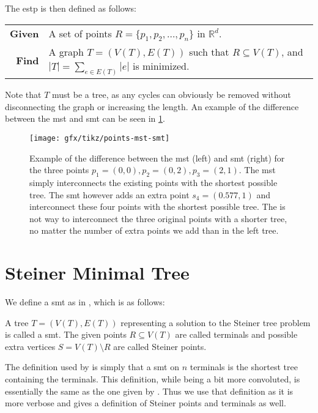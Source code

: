 The \ac{estp} is then defined as follows:
%
\begin{center}
  \begin{tabular}{rp{9cm}}
    \toprule
    \textbf{Given} & A set of points $R = \{ p_1, p_2, \ldots, p_n \}$ in
                     $\mathbb{R}^d$. \\
    \textbf{Find} & A graph $T = (V(T), E(T))$ such that $R \subseteq V(T)$, and
                    $|T| = \sum_{e \in E(T)} |e|$ is minimized. \\
    \bottomrule
  \end{tabular}
\end{center}
%
Note that $T$ must be a tree, as any cycles can obviously be removed without
disconnecting the graph or increasing the length. An example of the difference
between the \ac{mst} and \ac{smt} can be seen in \cref{fig:points-mst-smt}.
%
\begin{figure}[htbp]
  \centering
  \texttt{[image: gfx/tikz/points-mst-smt]}
  \caption[\ac{mst} vs. \ac{smt}]{Example of the difference between the \ac{mst} (left)
    and \ac{smt} (right) for the three points $p_1 = (0,0), p_2 = (0, 2), p_3 = (2,
    1)$. The \ac{mst} simply interconnects the existing points with the shortest
    possible tree. The \ac{smt} however adds an extra point $s_4 = (0.577, 1)$
    and interconnect these four points with the shortest possible tree. The is
    not way to interconnect the three original points with a shorter tree, no
    matter the number of extra points we add than in the left
    tree.\label{fig:points-mst-smt}}
\end{figure}

\section{Steiner Minimal Tree}
\label{sec:steiner-minimal-tree}

We define a \ac{smt} as in \textcite{brazil2015}, which is as follows:
%
\begin{definition}
  A tree $T = (V(T), E(T))$ representing a solution to the Steiner tree problem
  is called a \acl{smt}. The given points $R \subseteq V(T)$ are called
  terminals and possible extra vertices $S = V(T) \setminus R$ are called
  Steiner points.
\end{definition}
%
The definition used by \textcite{smith1992} is simply that a \ac{smt} on $n$
terminals is the shortest tree containing the terminals. This definition, while being
a bit more convoluted, is essentially the same as the one given by
\textcite{brazil2015}. Thus we use that definition as it is more verbose and
gives a definition of Steiner points and terminals as well.

